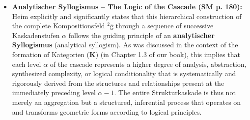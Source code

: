 \documentclass[12pt]{article}
\newcommand{\kategorie}{\bm{K}}
\newcommand{\kompositionsfeld}{{}^2\bar{\mathrm{g}}}
\newcommand{\kaskadenstufe}{\alpha}
\begin{document}
\begin{itemize}
    \item \textbf{Analytischer Syllogismus – The Logic of the Cascade (SM p. 180):}
    Heim explicitly and significantly states that this hierarchical construction of the complete Kompositionsfeld \( \kompositionsfeld \) through a sequence of successive Kaskadenstufen \( \kaskadenstufe \) follows the guiding principle of an \textbf{analytischer Syllogismus} (analytical syllogism). As was discussed in the context of the formation of Kategorien (\(\kategorie\)) (in Chapter 1.3 of our book), this implies that each level \( \kaskadenstufe \) of the cascade represents a higher degree of analysis, abstraction, synthesized complexity, or logical conditionality that is systematically and rigorously derived from the structures and relationships present at the immediately preceding level \( \kaskadenstufe-1 \). The entire Strukturkaskade is thus not merely an aggregation but a structured, inferential process that operates on and transforms geometric forms according to logical principles.


\end{itemize}
\end{document}
